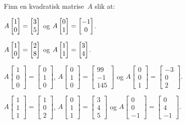 \begin{oppgave}
Finn en kvadratisk matrise~$A$ slik at:
\begin{punkt}
$A \begin{bmatrix} 1 \\ 0 \end{bmatrix} = \begin{bmatrix} 3 \\ 5 \end{bmatrix}$
og
$A \begin{bmatrix} 0 \\ 1 \end{bmatrix} = \begin{bmatrix} -1 \\ 0 \end{bmatrix}$.
\end{punkt}
\begin{punkt}
$A \begin{bmatrix} 1 \\ 0 \end{bmatrix} = \begin{bmatrix} 2 \\ 8 \end{bmatrix}$
og
$A \begin{bmatrix} 1 \\ 1 \end{bmatrix} = \begin{bmatrix} 3 \\ 4 \end{bmatrix}$.
\end{punkt}

\begin{punkt}
$A \begin{bmatrix}
1\\
0\\
0
\end{bmatrix}
 =  \begin{bmatrix}
0\\
1\\
0
\end{bmatrix} 
 $, $A \begin{bmatrix}
0\\
1\\
0
\end{bmatrix}
 =  \begin{bmatrix}
99\\
-1\\
145
\end{bmatrix} 
$ \newline 
og $A \begin{bmatrix}
0\\
0\\
1
\end{bmatrix}
 =  \begin{bmatrix}
-3\\
0\\
2
\end{bmatrix}.
 $
\end{punkt}

\begin{punkt}
$A \begin{bmatrix}
1\\
1\\
1
\end{bmatrix}
 =  \begin{bmatrix}
1\\
0\\
2
\end{bmatrix} 
 $, $A \begin{bmatrix}
0\\
1\\
1
\end{bmatrix}
 =  \begin{bmatrix}
3\\
4\\
5
\end{bmatrix} 
$ \newline 
og $A \begin{bmatrix}
0\\
0\\
-1
\end{bmatrix}
 =  \begin{bmatrix}
0\\
4\\
-1
\end{bmatrix}.
 $
\end{punkt}
\end{oppgave}
